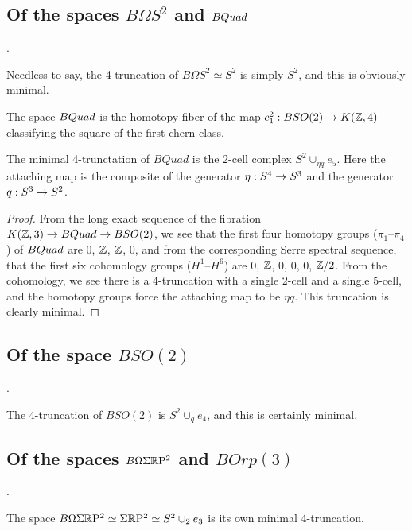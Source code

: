 \documentclass{amsart}
\begin{document}
\subsection{Of the spaces $B\Omega S^2$ and $BQuad$}.

Needless to say, the 4-truncation of $B\Omega S^2 \simeq S^2$ is simply $S^2$, and this is obviously minimal.

\begin{definition}[$BQuad$]
The space $BQuad$ is the homotopy fiber of the map $c_1^2: BSO(2) \rightarrow K(\mathbb Z,4)$ classifying the square of the first chern class.
\end{definition}


\begin{proposition} 
\label{prop-quadtrunc}
The minimal 4-trunctation of $BQuad$ is the 2-cell complex $S^2 \cup_{\eta q} e_5$.  Here the attaching map is the composite of the generator $\eta: S^4 \rightarrow S^3$ and the generator $q: S^3 \rightarrow S^2$.
\end{proposition}

\begin{proof}
From the long exact sequence of the fibration $K(\mathbb Z,3) \rightarrow BQuad \rightarrow BSO(2)$, we see that the first four homotopy groups ($\pi_1$--$\pi_4$) of $BQuad$ are $0$, $\mathbb Z$, $\mathbb Z$, $0$, and from the corresponding Serre spectral sequence, that the first six cohomology groups ($H^1$--$H^6$) are $0$, $\mathbb Z$, $0$, $0$, $0$, $\mathbb Z/2$.  From the cohomology, we see there is a 4-truncation with a single 2-cell and a single 5-cell, and the homotopy groups force the attaching map to be $\eta q$.  This truncation is clearly minimal.
\end{proof}

\subsection{Of the space $BSO(2)$}.

The 4-truncation of $BSO(2)$ is $S^2 \cup_q e_4$, and this is certainly minimal.

\subsection{Of the spaces $B \Omega \Sigma \mathbb R \mathrm{P}^2$ and $B Orp(3)$}.

The space $B \Omega \Sigma \mathbb R \mathrm{P}^2 \simeq \Sigma \mathbb R \mathrm{P}^2 \simeq S^2 \cup_2 e_3$ is its own minimal 4-truncation.
\end{document}
